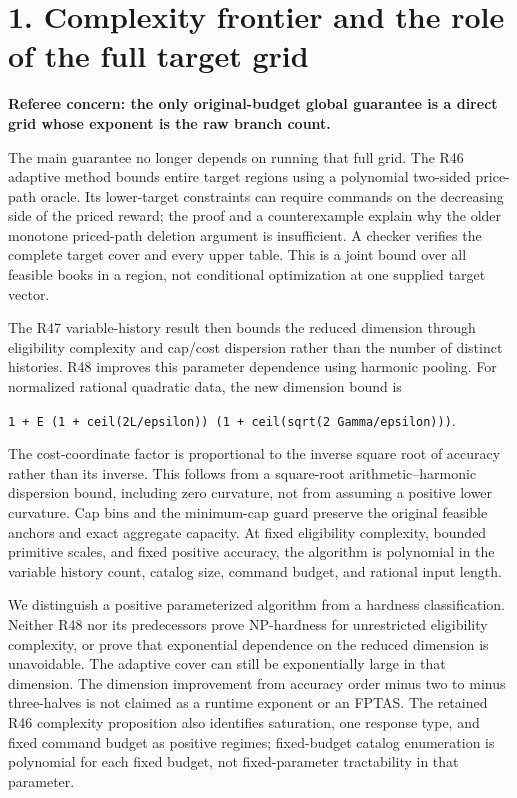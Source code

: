\documentclass[11pt,letterpaper]{article}
\begin{document}
\section*{1. Complexity frontier and the role of the full target grid}


\textbf{Referee concern: the only original-budget global guarantee is a direct grid whose exponent is the raw branch count.}



The main guarantee no longer depends on running that full grid. The R46 adaptive method bounds entire target regions using a polynomial two-sided price-path oracle. Its lower-target constraints can require commands on the decreasing side of the priced reward; the proof and a counterexample explain why the older monotone priced-path deletion argument is insufficient. A checker verifies the complete target cover and every upper table. This is a joint bound over all feasible books in a region, not conditional optimization at one supplied target vector.



The R47 variable-history result then bounds the reduced dimension through eligibility complexity and cap/cost dispersion rather than the number of distinct histories. R48 improves this parameter dependence using harmonic pooling. For normalized rational quadratic data, the new dimension bound is



\texttt{1 + E (1 + ceil(2L/epsilon)) (1 + ceil(sqrt(2 Gamma/epsilon)))}.



The cost-coordinate factor is proportional to the inverse square root of accuracy rather than its inverse. This follows from a square-root arithmetic--harmonic dispersion bound, including zero curvature, not from assuming a positive lower curvature. Cap bins and the minimum-cap guard preserve the original feasible anchors and exact aggregate capacity. At fixed eligibility complexity, bounded primitive scales, and fixed positive accuracy, the algorithm is polynomial in the variable history count, catalog size, command budget, and rational input length.



We distinguish a positive parameterized algorithm from a hardness classification. Neither R48 nor its predecessors prove NP-hardness for unrestricted eligibility complexity, or prove that exponential dependence on the reduced dimension is unavoidable. The adaptive cover can still be exponentially large in that dimension. The dimension improvement from accuracy order minus two to minus three-halves is not claimed as a runtime exponent or an FPTAS. The retained R46 complexity proposition also identifies saturation, one response type, and fixed command budget as positive regimes; fixed-budget catalog enumeration is polynomial for each fixed budget, not fixed-parameter tractability in that parameter.
\end{document}
